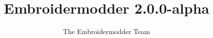 \documentclass{report}
\title{Embroidermodder 2.0.0-alpha}
\author{The Embroidermodder Team}
\begin{document}
\maketitle

\tableofcontents

\pagebreak
























\appendix



\printindex
\end{document}
